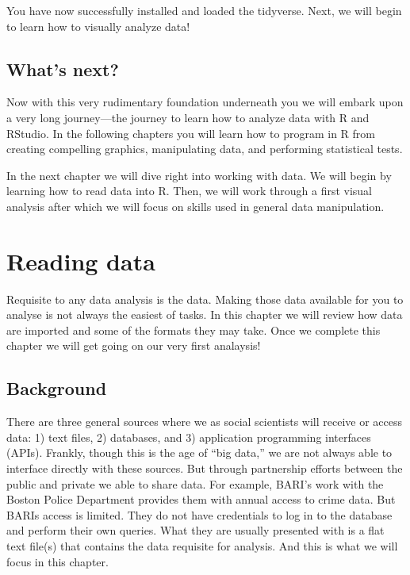 \documentclass[
]{book}
\begin{document}
You have now successfully installed and loaded the tidyverse. Next, we will begin to learn how to visually analyze data!

\hypertarget{whats-next}{%
\section{What's next?}\label{whats-next}}

Now with this very rudimentary foundation underneath you we will embark upon a very long journey---the journey to learn how to analyze data with R and RStudio. In the following chapters you will learn how to program in R from creating compelling graphics, manipulating data, and performing statistical tests.

In the next chapter we will dive right into working with data. We will begin by learning how to read data into R. Then, we will work through a first visual analysis after which we will focus on skills used in general data manipulation.

\hypertarget{reading-data}{%
\chapter{Reading data}\label{reading-data}}

Requisite to any data analysis is the data. Making those data available for you to analyse is not always the easiest of tasks. In this chapter we will review how data are imported and some of the formats they may take. Once we complete this chapter we will get going on our very first analaysis!

\hypertarget{background}{%
\section{Background}\label{background}}

There are three general sources where we as social scientists will receive or access data: 1) text files, 2) databases, and 3) application programming interfaces (APIs). Frankly, though this is the age of ``big data,'' we are not always able to interface directly with these sources. But through partnership efforts between the public and private we able to share data. For example, BARI's work with the Boston Police Department provides them with annual access to crime data. But BARIs access is limited. They do not have credentials to log in to the database and perform their own queries. What they are usually presented with is a flat text file(s) that contains the data requisite for analysis. And this is what we will focus in this chapter.
\end{document}
